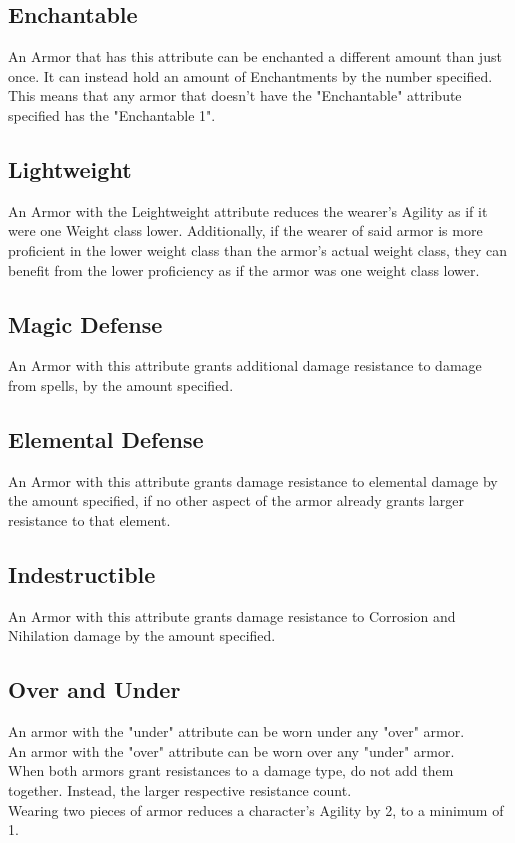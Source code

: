 \subsection{Enchantable}\label{armor:enchantable}
An Armor that has this attribute can be enchanted a different amount than just once.
It can instead hold an amount of Enchantments by the number specified.
This means that any armor that doesn't have the "Enchantable" attribute specified has the "Enchantable 1".

\subsection{Lightweight}\label{armor:lightweight}
An Armor with the Leightweight attribute reduces the wearer's Agility as if it were one Weight class lower.
Additionally, if the wearer of said armor is more proficient in the lower weight class than the armor's actual weight class, they can benefit from the lower proficiency as if the armor was one weight class lower.

\subsection{Magic Defense}\label{armor:magicDefense}
An Armor with this attribute grants additional damage resistance to damage from spells, by the amount specified.

\subsection{Elemental Defense}\label{armor:elementalDefense}
An Armor with this attribute grants damage resistance to elemental damage by the amount specified, if no other aspect of the armor already grants larger resistance to that element.

\subsection{Indestructible}\label{armor:indestructible}
An Armor with this attribute grants damage resistance to Corrosion and Nihilation damage by the amount specified.

\subsection{Over and Under}\label{armor:under}
An armor with the "under" attribute can be worn under any "over" armor.\\
An armor with the "over" attribute can be worn over any "under" armor.\\
When both armors grant resistances to a damage type, do not add them together.
Instead, the larger respective resistance count.\\
Wearing two pieces of armor reduces a character's Agility by 2, to a minimum of 1.

